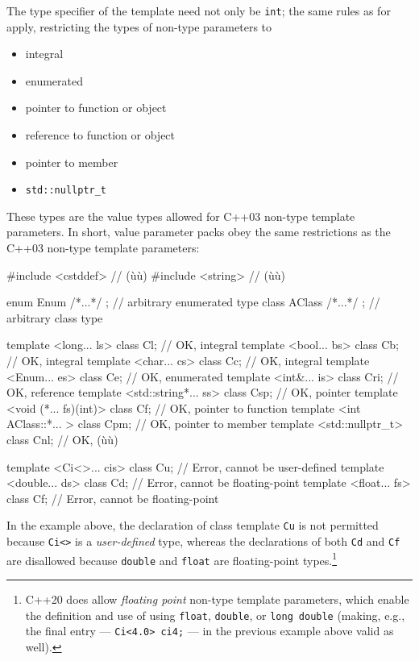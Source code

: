 \noindent The type specifier of the template  need
not only be \lstinline!int!; the same rules as for  apply, restricting the types of non-type parameters to
\begin{itemize}
\item{integral}
\item{enumerated}
\item{pointer to function or object}
\item{ reference to function or object}
\item{pointer to member}
\item{\lstinline!std::nullptr_t!}
\end{itemize}
These types are the value types allowed for C++03 non-type template
parameters. In short, value parameter packs obey the same restrictions
as the C++03 non-type template parameters:

\begin{emcppslisting}
#include <cstddef>  // (ù{}ù)
#include <string>  // (ù{}ù)

enum Enum { /*...*/ };                  // arbitrary enumerated type
class AClass { /*...*/ };               // arbitrary class type

template <long... ls>          class Cl;   // OK, integral
template <bool... bs>          class Cb;   // OK, integral
template <char... cs>          class Cc;   // OK, integral
template <Enum... es>          class Ce;   // OK, enumerated
template <int&... is>          class Cri;  // OK, reference
template <std::string*... ss>  class Csp;  // OK, pointer
template <void (*... fs)(int)> class Cf;   // OK, pointer to function
template <int AClass::*... >   class Cpm;  // OK, pointer to member
template <std::nullptr_t>     class Cnl;  // OK, (ù{}ù)

template <Ci<>... cis>         class Cu;   // Error, cannot be user-defined 
template <double... ds>        class Cd;   // Error, cannot be floating-point 
template <float... fs>         class Cf;   // Error, cannot be floating-point 
\end{emcppslisting}
    

\noindent In the example above, the declaration of class template \lstinline!Cu! is
not permitted because \lstinline!Ci<>! is a \emph{user-defined} type,
whereas the declarations of both \lstinline!Cd! and \lstinline!Cf! are
disallowed because \lstinline!double! and \lstinline!float! are floating-point
types.{\cprotect\footnote{C++20 does allow \emph{floating point}
non-type template parameters, which enable the definition and use of
 using \lstinline!float!,
\lstinline!double!, or \lstinline!long!~\lstinline!double! (making, e.g., the
final entry --- \lstinline!Ci<4.0>!~\lstinline!ci4;! --- in the previous
  example above valid as well).}}

